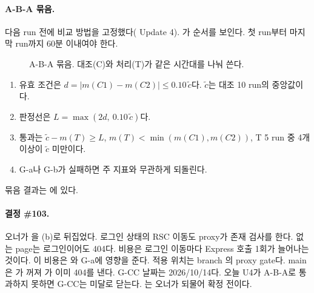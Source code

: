 \paragraph{A-B-A 묶음.}
다음 run 전에 비교 방법을 고정했다( Update 4).
가 순서를 보인다. 첫 run부터 마지막 run까지 60분 이내여야 한다.
\begin{figure}[H]
  \centering
  \flowlegend
  \caption{A-B-A 묶음. 대조(C)와 처리(T)가 같은 시간대를 나눠 쓴다.}
  \label{fig:re-aba}
\end{figure}
\begin{enumerate}[nosep]
  \item 유효 조건은 $d=|m(C1)-m(C2)|\le 0.10\,\tilde c$다. $\tilde c$는 대조 10 run의 중앙값이다.
  \item 판정선은 $L=\max(2d,\ 0.10\,\tilde c)$다.
  \item 통과는 $\tilde c-m(T)\ge L$, $m(T)<\min(m(C1),m(C2))$, T 5 run 중 4개 이상이 $\tilde c$ 미만이다.
  \item G-a나 G-b가 실패하면 주 지표와 무관하게 되돌린다.
\end{enumerate}
묶음 결과는 에 있다.

\paragraph{결정 \#103.}
오너가 을 (b)로 뒤집었다. 로그인 상태의 RSC 이동도 proxy가 존재 검사를 한다.
없는 page는 로그인이어도 404다. 비용은 로그인 이동마다 Express 호출 1회가 늘어나는 것이다.
이 비용은 와 G-a에 영향을 준다. 적용 위치는 branch 의 proxy gate다.
main은 가 꺼져 가 이미 404를 낸다.
G-CC 날짜는 2026/10/14다. 오늘 U4가 A-B-A로 통과하지 못하면 G-CC는 미달로 닫는다.
는 오너가 되물어 확정 전이다.

